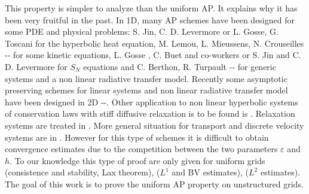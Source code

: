 \documentclass[a4paper,french,english,10pt]{article}
\newcommand\eps{\varepsilon}
\begin{document}
This property is simpler to analyze than the uniform AP. It explains
why it has been very fruitful in the past.
In 1D, many AP schemes have been designed for some PDE and physical problems: S.
Jin, C. D. Levermore \cite{jinlev} or L. Gosse, G. Toscani \cite{Gosse} for the
hyperbolic heat equation, M. Lemou, L. Mieussens, N. Crouseilles
\cite{lemou}-\cite{MMvlasov}-\cite{couplingRad} for some kinetic equations, L.
Gosse \cite{GosseSn}, C. Buet and co-workers \cite{buet} or S. Jin and C. D.
Levermore \cite{SnJin} for $S_N$ equations and C. Berthon, R. Turpault
\cite{ber1}-\cite{ber3}-\cite{ber4} for generic systems and a non linear
radiative transfer model. Recently some asymptotic preserving schemes for linear
systems and non linear radiative transfer model have been designed in 2D
\cite{glaceap}-\cite{cras}-\cite{FVCA6}.
Other application to non linear hyperbolic systems of conservation laws with stiff diffusive relaxation is to be found is
\cite{F1}. Relaxation systems are treated in \cite{F2}. More general situation 
for transport and discrete velocity systems are in \cite{F3,F4}.
 However for this type of schemes it is
 difficult to obtain convergence estimates due to the competition between
the two parameters $\eps$ and $h$. To our knowledge this type of
proof are only given for uniform grids \cite{glaceap} (consistence and
stability, Lax theorem), \cite{Gosse} ($L^1$ and BV estimates), \cite{mmcv}
($L^2$ estimates).
The goal of this work is to prove the uniform AP property on unstructured 
grids.
\end{document}
